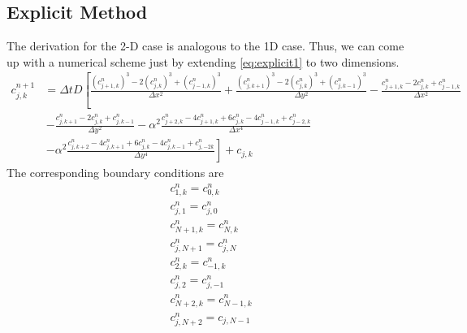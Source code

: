 \documentclass[]{article}
\theoremstyle{definition}
\numberwithin{equation}{section}
\numberwithin{equation}{section}
\begin{document}
\subsection{Explicit Method}
The derivation for the 2-D case is analogous to the 1D case. Thus, we can come up with a numerical scheme just by extending \eqref{eq:explicit1} to two dimensions.
\begin{align}
	c_{j,k}^{n+1} &= \Delta t D \left[\frac{(c_{j+1,k}^n)^3 - 2(c_{j,k}^n)^3 + (c_{j-1,k}^n)^3}{\Delta x^2} +\frac{(c_{j,k+1}^n)^3 - 2(c_{j,k}^n)^3 + (c_{j,k-1}^n)^3}{\Delta y^2}  - \frac{c_{j+1,k}^n -2c_{j,k}^n + c_{j-1,k}^n}{\Delta x^2} \right. \nonumber\\
	&\, \left. - \frac{c_{j,k+1}^n -2c_{j,k}^n + c_{j,k-1}^n}{\Delta y^2} - \alpha^2 \frac{c_{j+2,k}^n - 4c_{j+1,k}^n + 6c_{j,k}^n - 4c_{j-1,k}^n + c_{j-2,k}^n}{\Delta x^4} \right.  \nonumber \\
	&\, \left. - \alpha^2 \frac{c_{j,k+2}^n - 4c_{j,k+1}^n + 6c_{j,k}^n - 4c_{j,k-1}^n + c_{j,-2k}^n}{\Delta y^4} \right] + c_{j,k} \label{eq:2d_explicit}
\end{align}
The corresponding boundary conditions are
\begin{gather*}
	c_{1,k}^n = c_{0,k}^n \\
	c_{j,1}^n = c_{j,0}^n \\
	c_{N+1,k}^n = c_{N,k}^n \\
	c_{j,N+1}^n = c_{j,N}^n \\
	c_{2,k}^n = c_{-1,k}^n \\
	c_{j,2}^n = c_{j,-1}^n \\
	c_{N+2,k}^n = c_{N-1,k}^n \\
	c_{j,N+2}^n = c_{j,N-1}
\end{gather*}
\end{document}

